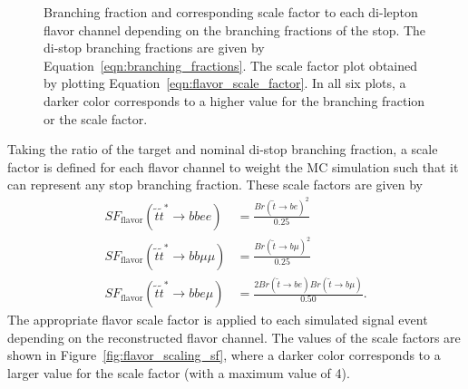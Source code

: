 \begin{figure}[ht]
  \centering
  \caption{Branching fraction and corresponding scale factor to each di-lepton
    flavor channel depending on the branching fractions of the stop.
    The di-stop branching fractions are given by
    Equation~\ref{eqn:branching_fractions}.
    The scale factor plot obtained by plotting
    Equation~\ref{eqn:flavor_scale_factor}.
    In all six plots, a darker color corresponds to a higher value for the
    branching fraction or the scale factor.
  }
  \label{fig:flavor_scaling}
\end{figure}

Taking the ratio of the target and nominal di-stop branching fraction, a
scale factor is defined for each flavor channel to weight the MC simulation
such that it can represent any stop branching fraction.
These scale factors are given by
\begin{equation}
  \label{eqn:flavor_scale_factor}
  \begin{aligned}
    SF_\mathrm{flavor}(\tilde{t}\tilde{t}^{*} \rightarrow bbee)     &=
      \frac{Br(\tilde{t} \rightarrow be)^2}{0.25} \\
    SF_\mathrm{flavor}(\tilde{t}\tilde{t}^{*} \rightarrow bb\mu\mu) &=
      \frac{Br(\tilde{t} \rightarrow b\mu)^2}{0.25} \\
    SF_\mathrm{flavor}(\tilde{t}\tilde{t}^{*} \rightarrow bbe\mu)   &=
      \frac{2Br(\tilde{t} \rightarrow be)Br(\tilde{t} \rightarrow b\mu)}{0.50}.
  \end{aligned}
\end{equation}
The appropriate flavor scale factor is applied to each simulated signal event
depending on the reconstructed flavor channel.
The values of the scale factors are shown in Figure~\ref{fig:flavor_scaling_sf},
where a darker color corresponds to a larger value for the scale factor (with a
maximum value of 4).

